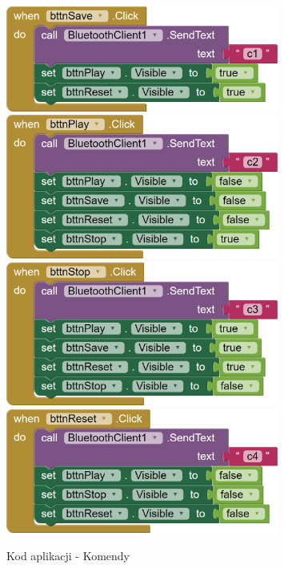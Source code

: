 \documentclass[11pt,titlepage,a4paper]{article}
\begin{document}
\newpage

\begin{figure}
    \begin{center}
        \includegraphics[width=0.8\textwidth]{img/app_src/commands/Save.png}
        \includegraphics[width=0.8\textwidth]{img/app_src/commands/Play.png}
        \includegraphics[width=0.8\textwidth]{img/app_src/commands/Stop.png}
        \includegraphics[width=0.8\textwidth]{img/app_src/commands/Reset.png}
    \end{center}
    \caption{Kod aplikacji - Komendy}
    \label{AppKomendy}
\end{figure}
\end{document}
